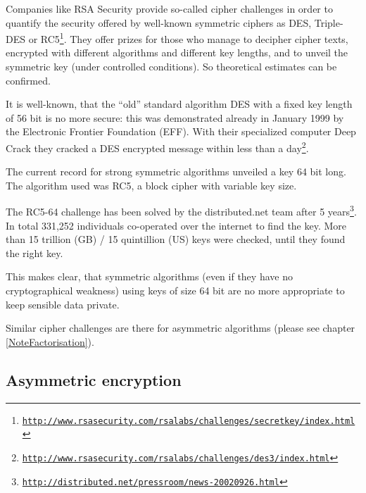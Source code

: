 Companies like RSA Security provide so-called cipher challenges in order to quantify the security offered by well-known symmetric ciphers as DES, Triple-DES or RC5\footnote{\href{http://www.rsasecurity.com/rsalabs/challenges/secretkey/index.html}{\tt http://www.rsasecurity.com/rsalabs/challenges/secretkey/index.html}}. They offer prizes for those who manage to decipher cipher texts, encrypted with different algorithms and different key lengths, and to unveil the symmetric key (under controlled conditions). So theoretical estimates can be confirmed.

It is well-known, that the ``old'' standard algorithm DES with a fixed key length of 56 bit is no more secure: this was demonstrated already in January 1999 by the Electronic Frontier Foundation (EFF). With their specialized computer Deep Crack they cracked a DES encrypted message within less than a day\footnote{\href{http://www.rsasecurity.com/rsalabs/challenges/des3/index.html}{\tt http://www.rsasecurity.com/rsalabs/challenges/des3/index.html}}.

The current record for strong symmetric algorithms unveiled a key 64 bit long. The algorithm used was RC5, a block cipher with variable key size. 

The RC5-64 challenge has been solved by the distributed.net team after 5 years\footnote{\href{http://distributed.net/pressroom/news-20020926.html}{\tt http://distributed.net/pressroom/news-20020926.html}}.  In total 331,252 individuals co-operated over the internet to find the key. More than 15 trillion (GB) / 15 quintillion (US)  keys were checked, until they found the right key.

This makes clear, that symmetric algorithms (even if they have no cryptographical weakness) using keys of size 64 bit are no more appropriate to keep sensible data private.

Similar cipher challenges are there for asymmetric algorithms (please see chapter \ref{NoteFactorisation}).




\subsection[Asymmetric encryption]
{Asymmetric encryption\footnotemark}


